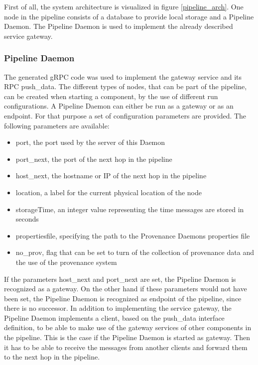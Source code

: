 First of all, the system architecture is visualized in figure \ref{pipeline_arch}. One node in the pipeline consists of a database to provide local storage and a Pipeline Daemon.
The Pipeline Daemon is used to implement the already described service gateway.

\subsubsection{Pipeline Daemon}
The generated gRPC code was used to implement the gateway service and its RPC push\_data. The different types of nodes, that can be part of the pipeline, can be created when starting a component, by the use of different run configurations. A Pipeline Daemon can either be run as a gateway or as an endpoint. For that purpose a set of configuration parameters are provided. The following parameters are available:
\begin{itemize}
\item port, the port used by the server of this Daemon
\item port\_next, the port of the next hop in the pipeline
\item host\_next, the hostname or IP of the next hop in the pipeline
\item location, a label for the current physical location of the node
\item storageTime, an integer value representing the time messages are stored in seconds
\item propertiesfile, specifying the path to the Provenance Daemons properties file 
\item no\_prov, flag that can be set to turn of the collection of provenance data and the use of the provenance system
\end{itemize}
If the parameters host\_next and port\_next are set, the Pipeline Daemon is recognized as a gateway. On the other hand if these parameters would not have been set, the Pipeline Daemon is recognized as endpoint of the pipeline, since there is no successor. In addition to implementing the service gateway, the Pipeline Daemon implements a client, based on the push\_data interface definition, to be able to make use of the gateway services of other components in the pipeline. This is the case if the Pipeline Daemon is started as gateway. Then it has to be able to receive the messages from another clients and forward them to the next hop in the pipeline. 

